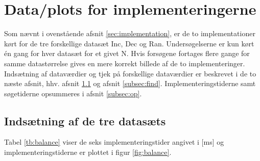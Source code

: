 \section{Data/plots for implementeringerne}
Som nævnt i ovenstående afsnit \ref{sec:implementation}, er de to implementationer kørt for de tre forskellige datasæt Inc, Dec og Ran. Undersøgelserne er kun kørt én gang for hver datasæt for et givet N. Hvis forsøgene fortages flere gange for samme datastørrelse gives en mere korrekt billede af de to implementeringer.\\
Indsætning af dataværdier og tjek på forskellige dataværdier er beskrevet i de to næste afsnit, hhv. afsnit \ref{subsec:ind} og afsnit \ref{subsec:find}. Implementeringstiderne samt søgetiderne opsummeres i afsnit \ref{subsec:op}.

\subsection{Indsætning af de tre datasæts}
\label{subsec:ind}
Tabel \ref{tb:balance} viser de seks implementeringstider angivet i [ms] og implementeringstiderne er plottet i figur \ref{fig:balance}.

